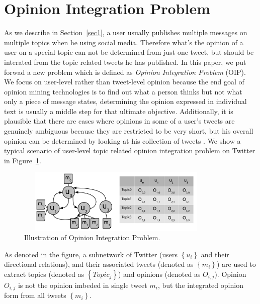 \documentclass[runningheads,a4paper]{llncs}
\begin{document}
\section{Opinion Integration Problem}
\label{sec3}

As we describe in Section~\ref{sec1}, a user usually publishes multiple messages on multiple topics when he using social media. Therefore what's the opinion of a user on a special topic can not be determined from just one tweet, but should be interated from the topic related tweets he has published. In this paper, we put forwad a new problem which is defined as \emph{Opinion Integration Problem} (OIP). We focus on user-level rather than tweet-level opinion because the end goal of opinion mining technologies is to find out what a person thinks but not what only a piece of message states, determining the opinion expressed in individual text is usually a middle step for that ultimate objective. Additionally, it is plausible that there are cases where opinions in some of a user’s tweets are genuinely ambiguous because they are restricted to be very short, but his overall opinion can be determined by looking at his collection of tweets \cite{tan2011user}. 
We show a typical scenario of user-level topic related opinion integration problem on Twitter in Figure~\ref{fig2}.
\begin{figure}[htb]
\centering
\includegraphics[width=3.8in,height=1.2in]{ego.pdf}
\caption{Illustration of Opinion Integration Problem.}
\label{fig2}
\end{figure}
As denoted in the figure, a subnetwork of Twitter (users $ \left\{ u_{i} \right\} $ and their directional relations), and their associated tweets (denoted as $ \left\{ m_{i} \right\} $) are used to extract topics (denoted as $ \left\{ Topic_{j} \right\} $) and opinions (denoted as $ O_{i,j} $). Opinion $ O_{i,j} $ is not the opinion imbeded in single tweet $ m_{i} $, but the integrated opinion form from all tweets $ \left\{ m_{i} \right\} $. 
\end{document}
